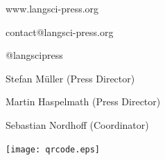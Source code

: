 \documentclass[
notumble,
nofoldmark,
]{leaflet}
\begin{document}
{    www.langsci-press.org}

{    contact@langsci-press.org}

  {@langscipress}


Stefan M\"uller (Press Director)

Martin Haspelmath (Press Director)

Sebastian Nordhoff (Coordinator)
 
 
\texttt{[image: qrcode.eps]} 
    







% 

 

\loggingall
\end{document}

